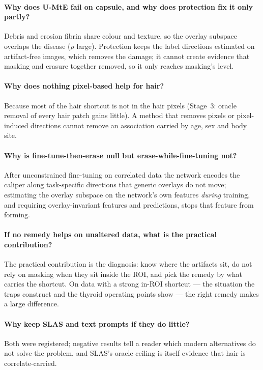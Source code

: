 \paragraph{Why does U-MtE fail on capsule, and why does protection fix it only partly?} Debris and erosion fibrin share
colour and texture, so the overlay subspace overlaps the disease ($\rho$ large). Protection keeps the label directions
estimated on artifact-free images, which removes the damage; it cannot create evidence that masking and erasure together
removed, so it only reaches masking's level.
\paragraph{Why does nothing pixel-based help for hair?} Because most of the hair shortcut is not in the hair pixels (Stage~3:
oracle removal of every hair patch gains little). A method that removes pixels or pixel-induced directions cannot remove an
association carried by age, sex and body site.
\paragraph{Why is fine-tune-then-erase null but erase-while-fine-tuning not?} After unconstrained fine-tuning on correlated
data the network encodes the caliper along task-specific directions that generic overlays do not move; estimating the
overlay subspace on the network's own features \emph{during} training, and requiring overlay-invariant features and
predictions, stops that feature from forming.
\paragraph{If no remedy helps on unaltered data, what is the practical contribution?} The practical contribution is the
diagnosis: know where the artifacts sit, do not rely on masking when they sit inside the ROI, and pick the remedy by what
carries the shortcut. On data with a strong in-ROI shortcut --- the situation the traps construct and the thyroid operating
points show --- the right remedy makes a large difference.
\paragraph{Why keep SLAS and text prompts if they do little?} Both were registered; negative results tell a reader which
modern alternatives do not solve the problem, and SLAS's oracle ceiling is itself evidence that hair is correlate-carried.

